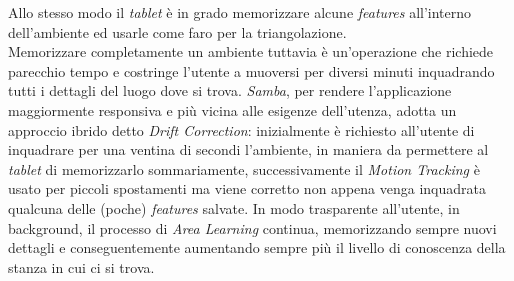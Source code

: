 Allo stesso modo il \emph{tablet} è in grado memorizzare alcune \emph{features} all'interno dell'ambiente ed usarle come faro per la triangolazione. \\
Memorizzare completamente un ambiente tuttavia è un'operazione che richiede parecchio tempo e costringe l'utente a muoversi per diversi minuti inquadrando tutti i dettagli del luogo dove si trova. \emph{Samba}, per rendere l'applicazione maggiormente responsiva e più vicina alle esigenze dell'utenza, adotta un approccio ibrido detto \emph{Drift Correction}: inizialmente è richiesto all'utente di inquadrare per una ventina di secondi l'ambiente, in maniera da permettere al \emph{tablet} di memorizzarlo sommariamente, successivamente il \emph{Motion Tracking} è usato per piccoli spostamenti ma viene corretto non appena venga inquadrata qualcuna delle (poche) \emph{features} salvate. In modo trasparente all'utente, in background, il processo di \emph{Area Learning} continua, memorizzando sempre nuovi dettagli e conseguentemente aumentando sempre più il livello di conoscenza della stanza in cui ci si trova.\\


